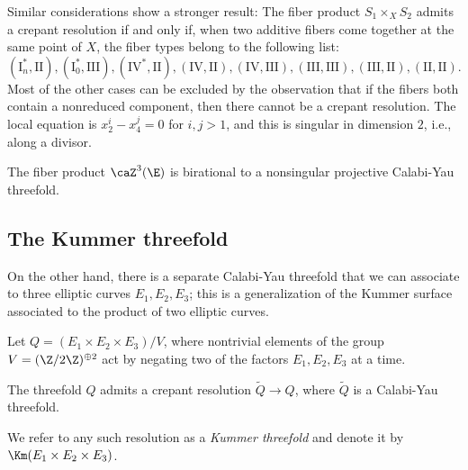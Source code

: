 \documentclass{article}
\newcommand{\adam}[1]{\textcolor{blue}{#1}}
\newcommand{\II}{\mathrm{II}}
\newcommand{\III}{\mathrm{III}}
\newcommand{\I}{\mathrm{I}}
\newcommand{\IV}{\mathrm{IV}}
\begin{document}
\begin{rmk} Similar considerations show a stronger result:  The fiber product $S_1\times_X S_2$ admits a crepant resolution if and only if, when two additive fibers come together at the same point of $X$, the fiber types belong to the following list:  $$(\I_n^*,\II), (\I_0^*,\III), (\IV^*,\II), (\IV,\II), (\IV,\III), (\III,\III), (\III,\II),
(\II,\II).$$
Most of the other cases can be excluded by the observation that
if the fibers both contain a nonreduced component,
then there cannot be a crepant resolution.  The local equation is
$x_2^i - x_4^j = 0$ for $i, j > 1$, and this is singular in dimension $2$,
i.e., along a divisor. 
\end{rmk}

\begin{cor} \label{CorZ3isCY} The fiber product $\caZ^3(\E)$ is birational to a nonsingular projective Calabi-Yau threefold.
\end{cor}


\subsection{The Kummer threefold}

On the other hand, there is a separate Calabi-Yau threefold that we can associate to three elliptic curves $E_1,E_2,E_3$;  this is a generalization of the Kummer surface associated to the product of two elliptic curves.

\begin{defn}
  Let $Q=(E_1\times E_2\times E_3)/V$, where nontrivial elements of the group $V=(\Z/2\Z)^{\oplus 2}$ act by negating two of the factors $E_1,E_2,E_3$ at a time.  
\end{defn}

\begin{prop} The threefold $Q$ admits a crepant resolution $\tilde{Q}\to Q$, where $\tilde{Q}$ is a Calabi-Yau threefold.  
\end{prop}

We refer to any such resolution as a {\em Kummer threefold} and denote it
by $\Km(E_1\times E_2\times E_3)$.
\end{document}
